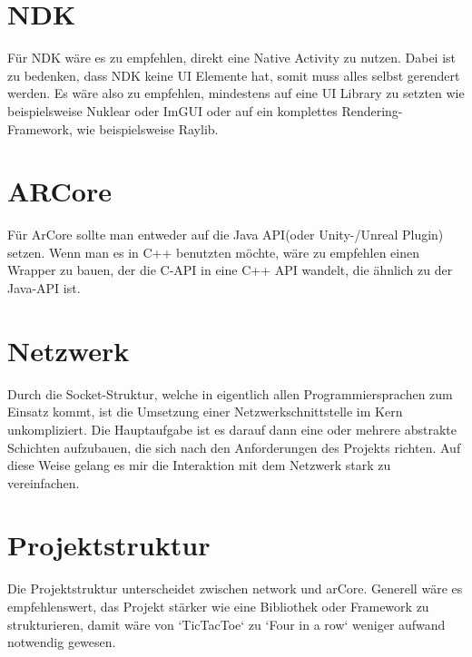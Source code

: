 \section{NDK}
Für NDK wäre es zu empfehlen, direkt eine Native Activity zu nutzen.
Dabei ist zu bedenken, dass NDK keine UI Elemente hat, somit muss alles selbst
gerendert werden. Es wäre also zu empfehlen, mindestens auf eine UI Library zu setzten
wie beispielsweise Nuklear oder ImGUI oder auf ein komplettes Rendering-Framework,
wie beispielsweise Raylib.

\section{ARCore}
Für ArCore sollte man entweder auf die Java API(oder Unity-/Unreal Plugin) setzen.
Wenn man es in C++ benutzten möchte, wäre zu empfehlen einen Wrapper zu bauen, der die
C-API in eine C++ API wandelt, die ähnlich zu der Java-API ist.

\section{Netzwerk}
Durch die Socket-Struktur, welche in eigentlich allen Programmiersprachen zum Einsatz kommt,
ist die Umsetzung einer Netzwerkschnittstelle im Kern unkompliziert. Die Hauptaufgabe ist es darauf
dann eine oder mehrere abstrakte Schichten aufzubauen, die sich nach den Anforderungen des Projekts
richten. Auf diese Weise gelang es mir die Interaktion mit dem Netzwerk stark zu vereinfachen.

\section{Projektstruktur}
Die Projektstruktur unterscheidet zwischen network und arCore. Generell wäre es empfehlenswert, das Projekt stärker wie eine Bibliothek oder Framework zu strukturieren, damit wäre von `TicTacToe` zu `Four in a row` weniger aufwand notwendig gewesen.
